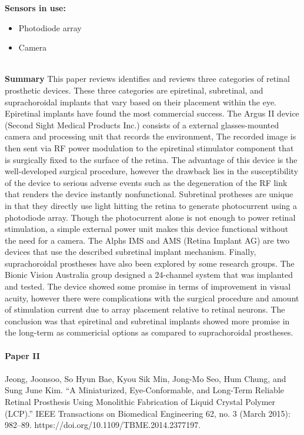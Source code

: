 \noindent
\textbf{Sensors in use:}
\begin{itemize}
    \item Photodiode array
    \item Camera \\ \\
\end{itemize}

\noindent
\textbf{Summary} This paper reviews identifies and reviews three categories of retinal prosthetic devices. These three categories are epiretinal, subretinal, and suprachoroidal implants that vary based on their placement within the eye. Epiretinal implants have found the most commercial success. The Argus II device (Second Sight Medical Products Inc.) consists of a external glasses-mounted camera and processing unit that records the environment, The recorded image is then sent via RF power modulation to the epiretinal stimulator component that is surgically fixed to the surface of the retina. The advantage of this device is the well-developed surgical procedure, however the drawback lies in the susceptibility of the device to serious adverse events such as the degeneration of the RF link that renders the device instantly nonfunctional. Subretinal protheses are unique in that they directly use light hitting the retina to generate photocurrent using a photodiode array. Though the photocurrent alone is not enough to power retinal stimulation, a simple external power unit makes this device functional without the need for a camera. The Alphs IMS and AMS (Retina Implant AG) are two devices that use the described subretinal implant mechanism. Finally, suprachoroidal prostheses have also been explored by some research groups. The Bionic Vision Australia group designed a 24-channel system that was implanted and tested. The device showed some promise in terms of improvement in visual acuity, however there were complications with the surgical procedure and amount of stimulation current due to array placement relative to retinal neurons. The conclusion was that epiretinal and subretinal implants showed more promise in the long-term as commericial options as compared to suprachoroidal prostheses. \\ \\


\textbf{Paper II} 
\\ \\
\noindent
Jeong, Joonsoo, So Hyun Bae, Kyou Sik Min, Jong-Mo Seo, Hum Chung, and Sung June Kim. “A Miniaturized, Eye-Conformable, and Long-Term Reliable Retinal Prosthesis Using Monolithic Fabrication of Liquid Crystal Polymer (LCP).” IEEE Transactions on Biomedical Engineering 62, no. 3 (March 2015): 982–89. https://doi.org/10.1109/TBME.2014.2377197. \\ \\

